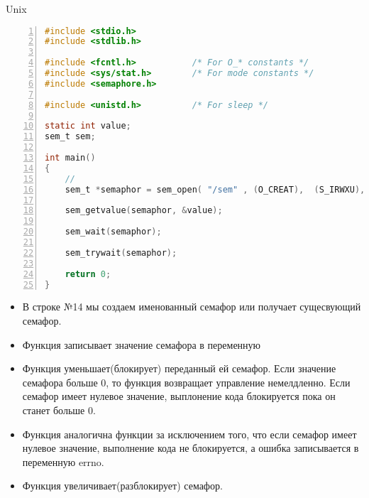 \documentclass[a4paper,12pt]{article}
\begin{document}
  \begin{center}
    Unix
  \end{center}
        \begin{lstlisting}[language=c,
                           breaklines=true,
                           showtabs=false,
                           showspaces=false,
                           showstringspaces=false,
                           numbers=left,
                           extendedchars=true,
                           numberstyle=\footnotesize,
                           stepnumber=1,
                           basicstyle=\ttfamily \footnotesize]
#include <stdio.h>
#include <stdlib.h>

#include <fcntl.h>           /* For O_* constants */
#include <sys/stat.h>        /* For mode constants */
#include <semaphore.h>

#include <unistd.h>          /* For sleep */

static int value;
sem_t sem;

int main()
{
    // 
    sem_t *semaphor = sem_open( "/sem" , (O_CREAT),  (S_IRWXU), 1 );

    sem_getvalue(semaphor, &value);

    sem_wait(semaphor);

    sem_trywait(semaphor);

    return 0;
}
        \end{lstlisting}



\begin{flushleft}
  \begin{itemize}
   \item В строке №14 мы создаем именованный семафор или получает сущесвующий семафор.
   \item Функция  записывает значение семафора в переменную 
   \item Функция  уменьшает(блокирует) переданный ей семафор. Если значение семафора больше 0, то функция возвращает управление немелдленно. Если семафор имеет нулевое значение, выплонение кода блокируется пока он станет больше 0.
   \item Функция  аналогична функции  за исключением того, что если семафор имеет нулевое значение, выполнение кода не блокируется, а ошибка записывается в переменную errno.
   \item Функция  увеличивает(разблокирует) семафор.
  \end{itemize}
    
\end{flushleft}
\end{document}
